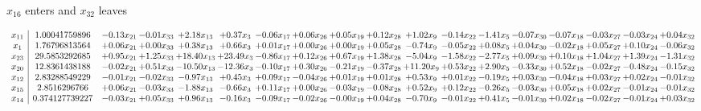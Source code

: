 \documentclass[9pt]{article}
\begin{document}
 $ x_{16} $ enters and $ x_{32} $ leaves 

 \[\begin{array}{c| c c@{\hskip 2pt} c@{\hskip 2pt} c@{\hskip 2pt} c@{\hskip 2pt} c@{\hskip 2pt} c@{\hskip 2pt} c@{\hskip 2pt} c@{\hskip 2pt} c@{\hskip 2pt} c@{\hskip 2pt} c@{\hskip 2pt} c@{\hskip 2pt} c@{\hskip 2pt} c@{\hskip 2pt} c@{\hskip 2pt} c@{\hskip 2pt} }
 x_{11}   &  1.00041759896 & -0.13 x_{21} & -0.01 x_{33} & +  2.18 x_{13} & +  0.37 x_{3} & -0.06 x_{17} & +  0.06 x_{26} & +  0.05 x_{19} & +  0.12 x_{28} & +  1.02 x_{9} & -0.14 x_{22} & -1.41 x_{5} & -0.07 x_{30} & -0.07 x_{18} & -0.03 x_{27} & -0.03 x_{24} & +  0.04 x_{32}\\
 x_{1}   &  1.76796813564 & +  0.06 x_{21} & +  0.00 x_{33} & +  0.38 x_{13} & +  0.66 x_{3} & +  0.01 x_{17} & +  0.00 x_{26} & +  0.00 x_{19} & +  0.05 x_{28} & -0.74 x_{9} & -0.05 x_{22} & +  0.08 x_{5} & +  0.04 x_{30} & -0.02 x_{18} & +  0.05 x_{27} & +  0.10 x_{24} & -0.06 x_{32}\\
 x_{23}   &  29.5853292685 & +  0.95 x_{21} & +  1.25 x_{33} & + 18.40 x_{13} & + 23.49 x_{3} & -0.86 x_{17} & +  0.12 x_{26} & +  0.67 x_{19} & +  1.38 x_{28} & -5.04 x_{9} & -1.58 x_{22} & -2.77 x_{5} & +  0.09 x_{30} & +  0.10 x_{18} & +  1.04 x_{27} & +  1.39 x_{24} & -1.31 x_{32}\\
 x_{20}   &  12.8361438188 & -0.02 x_{21} & +  0.51 x_{33} & -10.50 x_{13} & -12.36 x_{3} & -0.10 x_{17} & +  0.30 x_{26} & -0.21 x_{19} & -0.37 x_{28} & + 11.20 x_{9} & +  0.53 x_{22} & +  2.90 x_{5} & -0.33 x_{30} & +  0.52 x_{18} & -0.02 x_{27} & -0.48 x_{24} & -0.15 x_{32}\\
 x_{12}   &  2.83288549229 & -0.01 x_{21} & -0.02 x_{33} & -0.97 x_{13} & +  0.45 x_{3} & +  0.09 x_{17} & -0.04 x_{26} & +  0.01 x_{19} & +  0.01 x_{28} & +  0.53 x_{9} & +  0.01 x_{22} & -0.19 x_{5} & +  0.03 x_{30} & -0.04 x_{18} & +  0.03 x_{27} & +  0.02 x_{24} & -0.01 x_{32}\\
 x_{15}   &  2.8516296766 & +  0.06 x_{21} & -0.03 x_{33} & -1.88 x_{13} & -0.66 x_{3} & +  0.11 x_{17} & +  0.00 x_{26} & -0.03 x_{19} & -0.08 x_{28} & +  0.52 x_{9} & +  0.12 x_{22} & -0.26 x_{5} & -0.03 x_{30} & +  0.05 x_{18} & +  0.02 x_{27} & -0.01 x_{24} & -0.01 x_{32}\\
 x_{14}   &  0.374127739227 & -0.03 x_{21} & +  0.05 x_{33} & +  0.96 x_{13} & -0.16 x_{3} & -0.09 x_{17} & -0.02 x_{26} & -0.00 x_{19} & +  0.04 x_{28} & -0.70 x_{9} & -0.01 x_{22} & +  0.41 x_{5} & -0.01 x_{30} & +  0.02 x_{18} & -0.02 x_{27} & -0.01 x_{24} & +  0.03 x_{32}\\

\end{array}\]
\end{document}

